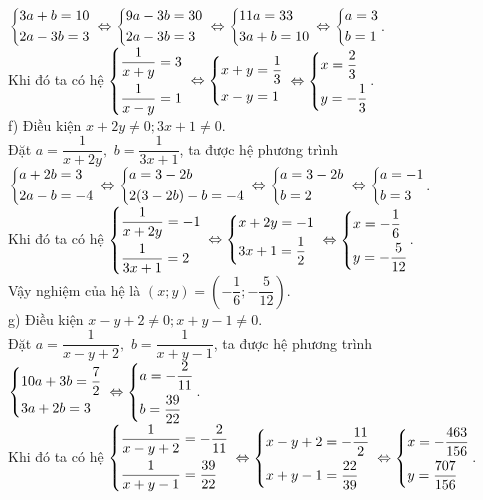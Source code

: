 \begin{ex}
{$\left\{\begin{aligned}& 3a+b=10\\ &  2a-3b=3\end{aligned}\right.$ $\Leftrightarrow \left\{\begin{aligned}& 9a -3b=30\\ &     2a-3b=3\end{aligned}\right.$ $\Leftrightarrow \left\{\begin{aligned}& 11a=33\\ & 3a+b=10\end{aligned}\right.$ $\Leftrightarrow \left\{\begin{aligned}&  a=3\\ & b=1\end{aligned}\right.$.\\
Khi đó ta  có  hệ $\left\{\begin{aligned}& \dfrac{1}{x+y}=3\\ & \dfrac{1}{x-y}=1\end{aligned}\right.$ $\Leftrightarrow \left\{\begin{aligned}& x+y=\dfrac{1}{3}\\ & x-y=1\end{aligned}\right.$ $\Leftrightarrow \left\{\begin{aligned}& x=\dfrac{2}{3}\\ & y=-\dfrac{1}{3}\end{aligned}\right.$.
   \\
   f) Điều kiện $x+2y\ne 0; 3x+1\ne 0$. \\
   Đặt $a=\dfrac{1}{x+2y},$ $b=\dfrac{1}{3x+1}$, ta  được hệ phương trình\\
$\left\{\begin{aligned}& a+2b=3\\ &  2a-b=-4\end{aligned}\right.$ $\Leftrightarrow \left\{\begin{aligned}& a=3-2b\\ & 2(3-2b)-b=-4\end{aligned}\right.$ $\Leftrightarrow \left\{\begin{aligned}& a=3-2b \\ & b=2\end{aligned}\right.$ $\Leftrightarrow \left\{\begin{aligned}&  a=-1\\ & b=3\end{aligned}\right.$.\\
Khi đó ta  có  hệ $\left\{\begin{aligned}& \dfrac{1}{x+2y}=-1\\ & \dfrac{1}{3x+1}=2\end{aligned}\right.$ $\Leftrightarrow \left\{\begin{aligned}& x+2y=-1 \\ & 3x+1=\dfrac{1}{2}\end{aligned}\right.$ $\Leftrightarrow \left\{\begin{aligned}& x=-\dfrac{1}{6}\\ & y=-\dfrac{5}{12}\end{aligned}\right.$.\\
Vậy nghiệm của  hệ là $(x;y)=\left(-\dfrac{1}{6};-\dfrac{5}{12}\right)$.
\\
g)     Điều kiện $x-y+2\ne 0; x+y-1\ne 0$. \\
   Đặt $a=\dfrac{1}{x-y+2},$ $b=\dfrac{1}{x+y-1}$, ta  được hệ phương trình\\
$\left\{\begin{aligned}& 10a+3b=\dfrac{7}{2}\\ &  3a+2b=3\end{aligned}\right.$ $\Leftrightarrow \left\{\begin{aligned}&  a=-\dfrac{2}{11}\\ & b=\dfrac{39}{22}\end{aligned}\right.$.\\
Khi đó ta  có  hệ $\left\{\begin{aligned}& \dfrac{1}{x-y+2} =-\dfrac{2}{11} \\ &\dfrac{1}{x+y-1} =\dfrac{39}{22}\end{aligned}\right.$ $\Leftrightarrow \left\{\begin{aligned}& x-y+2=-\dfrac{11}{2} \\ & x+y-1=\dfrac{22}{39}\end{aligned}\right.$ $\Leftrightarrow \left\{\begin{aligned}& x=-\dfrac{463}{156}\\ & y=\dfrac{707}{156}\end{aligned}\right.$.\\
}
\end{ex}
